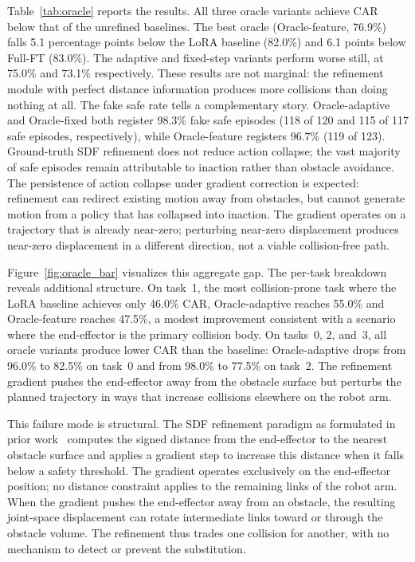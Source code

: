Table~\ref{tab:oracle} reports the results. All three oracle variants achieve CAR below that of the unrefined baselines. The best oracle (Oracle-feature, 76.9\%) falls 5.1 percentage points below the LoRA baseline (82.0\%) and 6.1 points below Full-FT (83.0\%). The adaptive and fixed-step variants perform worse still, at 75.0\% and 73.1\% respectively. These results are not marginal: the refinement module with perfect distance information produces more collisions than doing nothing at all. The fake safe rate tells a complementary story. Oracle-adaptive and Oracle-fixed both register 98.3\% fake safe episodes (118 of 120 and 115 of 117 safe episodes, respectively), while Oracle-feature registers 96.7\% (119 of 123). Ground-truth SDF refinement does not reduce action collapse; the vast majority of safe episodes remain attributable to inaction rather than obstacle avoidance. The persistence of action collapse under gradient correction is expected: refinement can redirect existing motion away from obstacles, but cannot generate motion from a policy that has collapsed into inaction. The gradient operates on a trajectory that is already near-zero; perturbing near-zero displacement produces near-zero displacement in a different direction, not a viable collision-free path.

Figure~\ref{fig:oracle_bar} visualizes this aggregate gap. The per-task breakdown reveals additional structure. On task~1, the most collision-prone task where the LoRA baseline achieves only 46.0\% CAR, Oracle-adaptive reaches 55.0\% and Oracle-feature reaches 47.5\%, a modest improvement consistent with a scenario where the end-effector is the primary collision body. On tasks~0, 2, and~3, all oracle variants produce lower CAR than the baseline: Oracle-adaptive drops from 96.0\% to 82.5\% on task~0 and from 98.0\% to 77.5\% on task~2. The refinement gradient pushes the end-effector away from the obstacle surface but perturbs the planned trajectory in ways that increase collisions elsewhere on the robot arm.

This failure mode is structural. The SDF refinement paradigm as formulated in prior work~\cite{hu2025vlsa} computes the signed distance from the end-effector to the nearest obstacle surface and applies a gradient step to increase this distance when it falls below a safety threshold. The gradient operates exclusively on the end-effector position; no distance constraint applies to the remaining links of the robot arm. When the gradient pushes the end-effector away from an obstacle, the resulting joint-space displacement can rotate intermediate links toward or through the obstacle volume. The refinement thus trades one collision for another, with no mechanism to detect or prevent the substitution.

